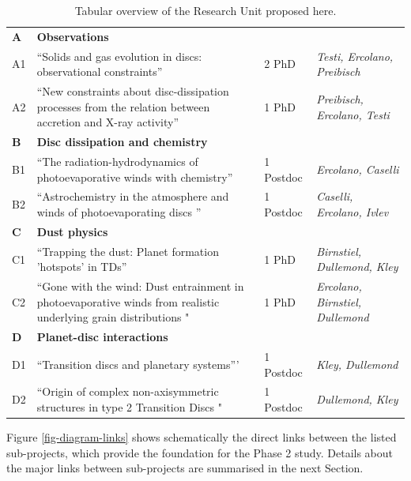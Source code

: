 \documentclass[10pt,fleqn,twoside]{article}
\newcommand{\AreacolA}{\color{blue}}
\newcommand{\AreacolB}{\color{Green}}
\newcommand{\AreacolC}{\color{YellowOrange}}
\newcommand{\AreacolD}{\color{Red}}
\begin{document}
\begin{table}
\noindent
\begin{tabular}{p{1cm}p{8cm}p{2.0cm}p{3.9cm}}
\hline
{\bf\AreacolA A} & {\bf\AreacolA Observations} & & \\ 
A1 & ``Solids and gas evolution in discs: observational constraints'' & 2 PhD & {\em Testi, Ercolano, Preibisch}\\
A2 & ``New constraints about disc-dissipation processes from the relation between accretion and X-ray activity'' & 1 PhD & {\em Preibisch, Ercolano, Testi}\\
\hline
{\bf\AreacolB B} & {\bf\AreacolB Disc dissipation and chemistry} & & \\ 
B1 & ``The radiation-hydrodynamics of photoevaporative winds with chemistry'' & 1 Postdoc & {\em Ercolano, Caselli}\\
B2 & ``Astrochemistry in the atmosphere and winds of photoevaporating discs '' & 1 Postdoc & {\em
                                                              Caselli,
                                                              Ercolano,
                                                              Ivlev}\\
\hline
{\bf\AreacolC C} & {\bf\AreacolC Dust physics} & & \\ 
C1 & ``Trapping the dust: Planet formation 'hotspots' in TDs'' & 1 PhD
                               & {\em Birnstiel, Dullemond, Kley}\\
C2 & ``Gone with the wind: Dust entrainment in photoevaporative winds
     from realistic underlying grain distributions "& 1 PhD & {\em
                                                              Ercolano,
                                                              Birnstiel,
                                                              Dullemond}\\
\hline
{\bf\AreacolD D} & {\bf\AreacolD Planet-disc interactions} & & \\ 
D1 & ``Transition discs and planetary systems''' & 1 Postdoc & {\em Kley, Dullemond}\\
D2 & ``Origin of complex non-axisymmetric structures in type 2
     Transition Discs "& 1 Postdoc & {\em Dullemond, Kley}\\
\hline
\end{tabular}
\caption{\label{table-overview-ru}
Tabular overview of the Research Unit proposed here.}
\end{table}


Figure \ref{fig-diagram-links} shows schematically the direct links between
the listed sub-projects, which provide the foundation for the Phase 2
study.  Details about the major links between
sub-projects are summarised in the next Section.
\end{document}
